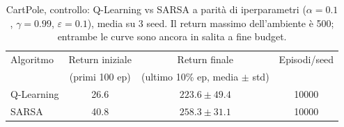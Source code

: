 \begin{table}[htbp]
\centering
\caption{CartPole, controllo: Q-Learning vs SARSA a parit\`a di iperparametri ($\alpha=0.1$, $\gamma=0.99$, $\varepsilon=0.1$), media su 3 seed. Il return massimo dell'ambiente \`e 500; entrambe le curve sono ancora in salita a fine budget.}
\label{tab:cartpole-control}
\begin{tabular}{lccc}
\toprule
Algoritmo & Return iniziale & Return finale & Episodi/seed \\
          & (primi 100 ep) & (ultimo 10\% ep, media $\pm$ std) & \\
\midrule
Q-Learning & 26.6 & $223.6 \pm 49.4$ & 10000 \\
SARSA & 40.8 & $258.3 \pm 31.1$ & 10000 \\
\bottomrule
\end{tabular}
\end{table}
